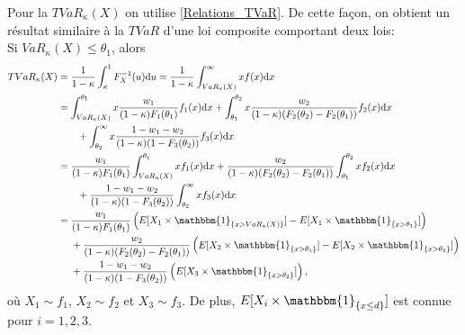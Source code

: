 	Pour la $TVaR_{\kappa}(X)$ on utilise \ref{Relations_TVaR}. De cette façon, on obtient un résultat similaire à la $TVaR$ d'une loi composite comportant deux lois:\\
	
	Si $VaR_{\kappa}(X) \leq \theta_1$, alors
	\begin{align*}
		TVaR_{\kappa}(X) &= \frac{1}{1-\kappa} \int_{\kappa}^{1} F_X^{-1}(u) \textrm{d}u = \frac{1}{1-\kappa}  \int_{VaR_{\kappa}(X)}^{\infty} x f(x) \textrm{d}x\\
		&= \int_{VaR_{\kappa}(X)}^{\theta_1} x \frac{w_1}{(1-\kappa)F_1(\theta_1)}f_1(x) \textrm{d}x + \int_{\theta_1}^{\theta_2} x \frac{w_2}{(1-\kappa)(F_2(\theta_2)-F_2(\theta_1))}f_2(x) \textrm{d}x \\
		& \ \ \ \ \ \ + \int_{\theta_2}^{\infty} x  \frac{1-w_1-w_2}{(1-\kappa)(1-F_3(\theta_2))} f_3(x) \textrm{d}x\\
		&= \frac{w_1}{(1-\kappa)F_1(\theta_1)} \int_{VaR_{\kappa}(X)}^{\theta_1} x f_1(x) \textrm{d}x +  \frac{w_2}{(1-\kappa)(F_2(\theta_2)-F_2(\theta_1))} \int_{\theta_1}^{\theta_2} x f_2(x) \textrm{d}x \\
		&\ \ \ \ \ \ + \frac{1-w_1-w_2}{(1-\kappa)(1-F_3(\theta_2))} \int_{\theta_2}^{\infty} x   f_3(x) \textrm{d}x\\
		&= \frac{w_1}{(1-\kappa)F_1(\theta_1)}\left( E[X_1 \times \mathbbm{1}_{\left\{ x >  VaR_{\kappa}(X) \right\}}] - E[X_1 \times \mathbbm{1}_{\left\{ x > \theta_1  \right\}}]  \right)\\
		& \ \ \ \ +  \frac{w_2}{(1-\kappa)(F_2(\theta_2)-F_2(\theta_1))} \left(E[X_2 \times \mathbbm{1}_{\left\{ x > \theta_1  \right\}}] -E[X_2 \times \mathbbm{1}_{\left\{ x > \theta_2\right\}}]   \right)\\
		&\ \ \ \ +  \frac{1-w_1-w_2}{(1-\kappa)(1-F_3(\theta_2))} \left( E[X_3 \times \mathbbm{1}_{\left\{ x > \theta_2 \right\}}]\right),
	\end{align*}	
	où $X_1\sim f_1$, $X_2\sim f_2$ et $X_3\sim f_3$. De plus, $E[X_i \times \mathbbm{1}_{\left\{ x \leq d \right\}} ]$ est connue pour $i=1,2,3$.\\
	
